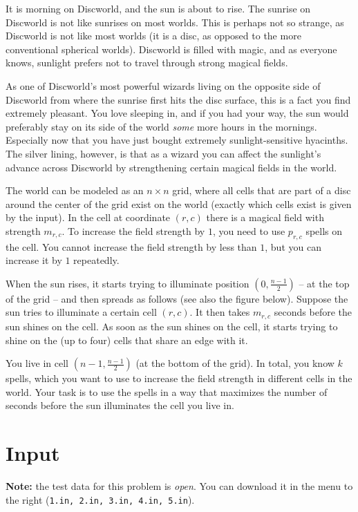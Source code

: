 It is morning on Discworld, and the sun is about to rise.
The sunrise on Discworld is not like sunrises on most worlds.
This is perhaps not so strange, as Discworld is not like most worlds (it is a disc, as opposed to the more conventional spherical worlds).
Discworld is filled with magic, and as everyone knows, sunlight prefers not to travel through strong magical fields.

As one of Discworld's most powerful wizards living on the opposite side of Discworld from where the sunrise first hits the disc surface, this is a fact you find extremely pleasant.
You love sleeping in, and if you had your way, the sun would preferably stay on its side of the world \emph{some} more hours in the mornings.
Especially now that you have just bought extremely sunlight-sensitive hyacinths.
The silver lining, however, is that as a wizard you can affect the sunlight's advance across Discworld by strengthening certain magical fields in the world.

The world can be modeled as an $n \times n$ grid, where all cells that are part of a disc around the center of the grid exist on the world (exactly which cells exist is given by the input).
In the cell at coordinate $(r, c)$ there is a magical field with strength $m_{r, c}$.
To increase the field strength by $1$, you need to use $p_{r, c}$ spells on the cell.
You cannot increase the field strength by less than $1$, but you can increase it by $1$ repeatedly.

When the sun rises, it starts trying to illuminate position $(0, \frac{n - 1}{2})$ -- at the top of the grid -- and then spreads as follows (see also the figure below).
Suppose the sun tries to illuminate a certain cell $(r, c)$.
It then takes $m_{r, c}$ seconds before the sun shines on the cell.
As soon as the sun shines on the cell, it starts trying to shine on the (up to four) cells that share an edge with it.

You live in cell $(n-1, \frac{n-1}{2})$ (at the bottom of the grid).
In total, you know $k$ spells, which you want to use to increase the field strength in different cells in the world.
Your task is to use the spells in a way that maximizes the number of seconds before the sun illuminates the cell you live in.

\section*{Input}
\textbf{Note:} the test data for this problem is \emph{open}. You can download it in the menu to the right (\texttt{1.in, 2.in, 3.in, 4.in, 5.in}).

